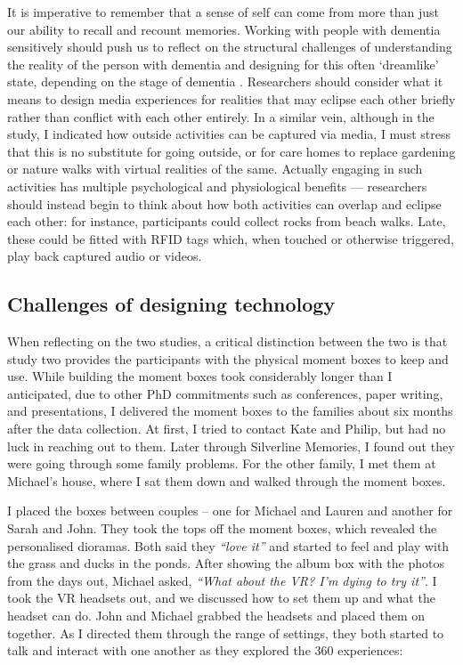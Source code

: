 It is imperative to remember that a sense of self can come from more than just our ability to recall and recount memories. Working with people with dementia sensitively should push us to reflect on the structural challenges of understanding the reality of the person with dementia and designing for this often `dreamlike' state, depending on the stage of dementia \citep{bryden_before_2015}. Researchers should consider what it means to design media experiences for realities that may eclipse each other briefly rather than conflict with each other entirely. In a similar vein,  although in the study, I indicated how outside activities can be captured via media, I must stress that this is no substitute for going outside, or for care homes to replace gardening or nature walks with virtual realities of the same. Actually engaging in such activities has multiple psychological and physiological benefits \citep{gilliard_transforming_2011} — researchers should instead begin to think about how both activities can overlap and eclipse each other: for instance, participants could collect rocks from beach walks. Late, these could be fitted with RFID tags which, when touched or otherwise triggered, play back captured audio or videos.

\subsection{Challenges of designing technology}
\label{robust-tech}
When reflecting on the two studies, a critical distinction between the two is that study two provides the participants with the physical moment boxes to keep and use. While building the moment boxes took considerably longer than I anticipated, due to other PhD commitments such as conferences, paper writing, and presentations, I delivered the moment boxes to the families about six months after the data collection. At first, I tried to contact Kate and Philip, but had no luck in reaching out to them. Later through Silverline Memories, I found out they were going through some family problems. For the other family, I met them at Michael's house, where I sat them down and walked through the moment boxes.

I placed the boxes between couples – one for Michael and Lauren and another for Sarah and John. They took the tops off the moment boxes, which revealed the personalised dioramas. Both said they \textit{``love it''} and started to feel and play with the grass and ducks in the ponds. After showing the album box with the photos from the days out, Michael asked, \textit{``What about the VR? I'm dying to try it''}. I took the VR headsets out, and we discussed how to set them up and what the headset can do. John and Michael grabbed the headsets and placed them on together. As I directed them through the range of settings, they both started to talk and interact with one another as they explored the 360 experiences:

